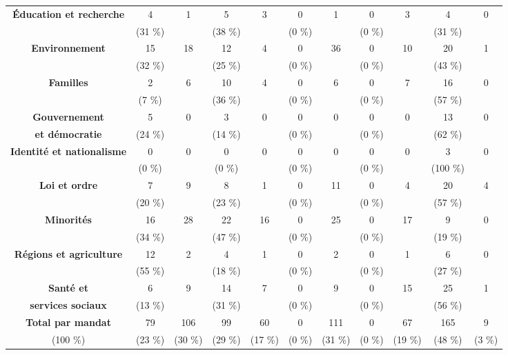 \documentclass{article}
\begin{document}
\begin{landscape}
\begin {table}[]
\begin{tabularx}{\linewidth}{ c *{10}{C} }
\textbf{Éducation et recherche} & 4 & 1 & 5 & 3 & 0 & 1 & 0 & 3 & 4 & 0  \\ 
 &  (31 \%) &  & (38 \%) & &  (0 \%) &  & (0 \%) &  & (31 \%) \\ \hline  
  
\textbf{Environnement} & 15 & 18 & 12 & 4 & 0 & 36 & 0 & 10 & 20 & 1 \\
& (32 \%) & &  (25 \%) &  & (0 \%) & &  (0 \%) &  & (43 \%) & \\ \hline  
  
\textbf{Familles} & 2 & 6 & 10 & 4 & 0 & 6 & 0 & 7 & 16 & 0 \\
& (7 \%)  & & (36 \%)  & & (0 \%)  & & (0 \%)  & & (57 \%)  &  \\ \hline  
  
\textbf{Gouvernement} & 5 & 0 & 3 & 0 & 0 & 0 & 0 & 0 & 13 & 0 \\
\textbf{et démocratie} & (24 \%)  & & (14 \%) & &  (0 \%) &  & (0 \%) & &  (62 \%)  &  \\ \hline
  
\textbf{Identité et nationalisme} & 0 & 0 & 0 & 0 & 0 & 0 & 0 & 0 & 3 & 0 \\
& (0 \%) &  & (0 \%) &  & (0 \%) &  & (0 \%) &  & (100 \%)\\ \hline
  
\textbf{Loi et ordre} & 7 & 9 & 8 & 1 & 0 & 11 & 0 & 4 & 20 & 4 \\
& (20 \%) &  & (23 \%) &  & (0 \%) &  & (0 \%) &  & (57 \%)  &  \\ \hline  

\textbf{Minorités} & 16 & 28 & 22 & 16 & 0 & 25 & 0 & 17 & 9 & 0  \\
& (34 \%) &  & (47 \%) &  & (0 \%) &  & (0 \%) & &  (19 \%)  &  \\ \hline

\textbf{Régions et agriculture} & 12 & 2 & 4 & 1 & 0 & 2 & 0 & 1 & 6 & 0 \\
 & (55 \%) &  & (18 \%) & &  (0 \%) & &  (0 \%) &  & (27 \%)  & \\ \hline

\textbf{Santé et} & 6 & 9 & 14 & 7 & 0  &  9 & 0 & 15 & 25 & 1 \\
\textbf{services sociaux} & (13 \%)  & & (31 \%)  & & (0 \%) & & (0 \%) & &  (56 \%)  & \\ \hline 

\textbf{Total par mandat} & 79  & 106 & 99  & 60 & 0  & 111 & 0  & 67 & 165 & 9  \\
(100 \%) & (23 \%) & (30 \%) & (29 \%) & (17 \%) & (0 \%) & (31 \%) & (0 \%) & (19 \%) & (48 \%) & (3 \%) \\ \hline
 

    \bottomrule
\end{tabularx}
    \end{table}
    \end{landscape}
\end{document}
